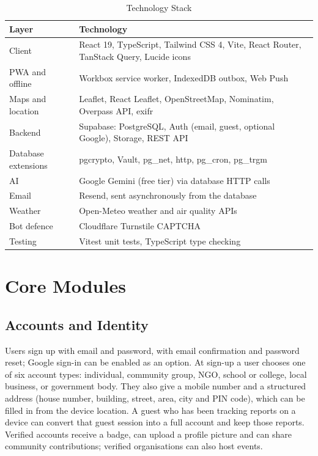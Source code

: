 \documentclass[conference]{IEEEtran}
\begin{document}
\begin{table}[htbp]
\caption{Technology Stack}
\label{tab:2}
\begin{center}
\footnotesize
\begin{tabular}{|>{\raggedright\arraybackslash}p{}|>{\raggedright\arraybackslash}p{}|}
\hline
\textbf{Layer} & \textbf{Technology} \\
\hline
Client & React 19, TypeScript, Tailwind CSS 4, Vite, React Router, TanStack Query, Lucide icons \\ \hline
PWA and offline & Workbox service worker, IndexedDB outbox, Web Push \\ \hline
Maps and location & Leaflet, React Leaflet, OpenStreetMap, Nominatim, Overpass API, exifr \\ \hline
Backend & Supabase: PostgreSQL, Auth (email, guest, optional Google), Storage, REST API \\ \hline
Database extensions & pgcrypto, Vault, pg\_net, http, pg\_cron, pg\_trgm \\ \hline
AI & Google Gemini (free tier) via database HTTP calls \\ \hline
Email & Resend, sent asynchronously from the database \\ \hline
Weather & Open-Meteo weather and air quality APIs \\ \hline
Bot defence & Cloudflare Turnstile CAPTCHA \\ \hline
Testing & Vitest unit tests, TypeScript type checking \\ \hline
\end{tabular}
\end{center}
\end{table}
\section{Core Modules}
\subsection{Accounts and Identity}
Users sign up with email and password, with email confirmation and password reset; Google sign-in can be enabled as an option. At sign-up a user chooses one of six account types: individual, community group, NGO, school or college, local business, or government body. They also give a mobile number and a structured address (house number, building, street, area, city and PIN code), which can be filled in from the device location. A guest who has been tracking reports on a device can convert that guest session into a full account and keep those reports. Verified accounts receive a badge, can upload a profile picture and can share community contributions; verified organisations can also host events.
\end{document}
